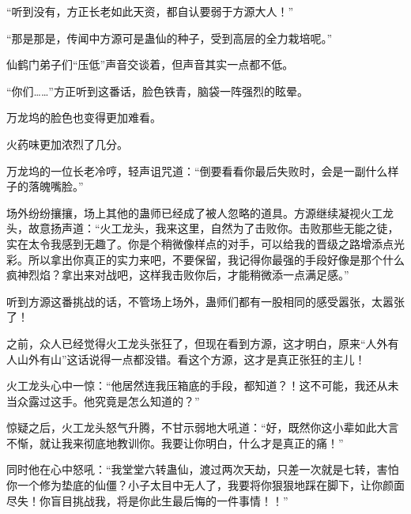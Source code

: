 \begin{this_body}
“听到没有，方正长老如此天资，都自认要弱于方源大人！”

“那是那是，传闻中方源可是蛊仙的种子，受到高层的全力栽培呢。”

仙鹤门弟子们“压低”声音交谈着，但声音其实一点都不低。

“你们……”方正听到这番话，脸色铁青，脑袋一阵强烈的眩晕。

万龙坞的脸色也变得更加难看。

火药味更加浓烈了几分。

万龙坞的一位长老冷哼，轻声诅咒道：“倒要看看你最后失败时，会是一副什么样子的落魄嘴脸。”

场外纷纷攘攘，场上其他的蛊师已经成了被人忽略的道具。方源继续凝视火工龙头，故意扬声道：“火工龙头，我来这里，自然为了击败你。击败那些无能之徒，实在太令我感到无趣了。你是个稍微像样点的对手，可以给我的晋级之路增添点光彩。所以拿出你真正的实力来吧，不要保留，我记得你最强的手段好像是那个什么疯神烈焰？拿出来对战吧，这样我击败你后，才能稍微添一点满足感。”

听到方源这番挑战的话，不管场上场外，蛊师们都有一股相同的感受嚣张，太嚣张了！

之前，众人已经觉得火工龙头张狂了，但现在看到方源，这才明白，原来“人外有人山外有山”这话说得一点都没错。看这个方源，这才是真正张狂的主儿！

火工龙头心中一惊：“他居然连我压箱底的手段，都知道？！这不可能，我还从未当众露过这手。他究竟是怎么知道的？”

惊疑之后，火工龙头怒气升腾，不甘示弱地大吼道：“好，既然你这小辈如此大言不惭，就让我来彻底地教训你。我要让你明白，什么才是真正的痛！”

同时他在心中怒吼：“我堂堂六转蛊仙，渡过两次天劫，只差一次就是七转，害怕你一个修为垫底的仙僵？小子太目中无人了，我要将你狠狠地踩在脚下，让你颜面尽失！你盲目挑战我，将是你此生最后悔的一件事情！！”

\end{this_body}

